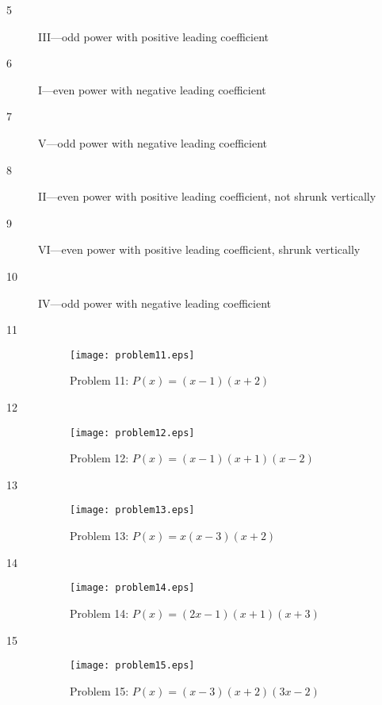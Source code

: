 \documentclass[landscape]{exam}
\begin{document}
  \begin{description}

    \item[5] III---odd power with positive leading coefficient

    \item[6] I---even power with negative leading coefficient

    \item[7] V---odd power with negative leading coefficient
      
    \item[8] II---even power with positive leading coefficient, not shrunk vertically
      
    \item[9] VI---even power with positive leading coefficient, shrunk vertically

    \item[10] IV---odd power with negative leading coefficient

    \item[11]
      \begin{figure}[H]
        \centering
        \texttt{[image: problem11.eps]}
        \caption*{Problem 11: $P(x) = (x - 1)(x + 2)$}
      \end{figure}

    \item[12]
      \begin{figure}[H]
        \centering
        \texttt{[image: problem12.eps]}
        \caption*{Problem 12: $P(x) = (x - 1)(x + 1)(x - 2)$}
      \end{figure}

    \item[13]
      \begin{figure}[H]
        \centering
        \texttt{[image: problem13.eps]}
        \caption*{Problem 13: $P(x) = x(x - 3)(x + 2)$}
      \end{figure}

    \item[14]
      \begin{figure}[H]
        \centering
        \texttt{[image: problem14.eps]}
        \caption*{Problem 14: $P(x) = (2x - 1)(x + 1)(x + 3)$}
      \end{figure}

    \item[15]
      \begin{figure}[H]
        \centering
        \texttt{[image: problem15.eps]}
        \caption*{Problem 15: $P(x) = (x - 3)(x + 2)(3x - 2)$}
      \end{figure}


\end{description}
\end{document}
